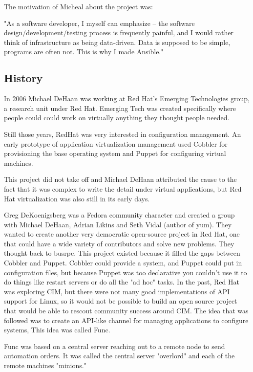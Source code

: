 \documentclass[12pt,a4paper,openright,twoside]{book}
\begin{document}
The motivation of Micheal about the project was:


"As a software developer, I myself can emphasize -- the software design/development/testing process is frequently painful, and I would rather think of infrastructure as being data-driven. Data is supposed to be simple, programs are often not. This is why I made Ansible."

\subsection{History}
In 2006 Michael DeHaan was working at Red Hat's Emerging Technologies group, a research unit under Red Hat. Emerging Tech was created specifically where people could could work on virtually anything they thought people needed.


Still those years, RedHat was very interested in configuration management. An early prototype of application virtualization management used Cobbler for provisioning the base operating system and Puppet for configuring virtual machines.


This project did not take off and Michael DeHaan attributed the cause to the fact that it was complex to write the detail under virtual applications, but Red Hat virtualization was also still in its early days.


Greg DeKoenigsberg was a Fedora community character and created a group with Michael DeHaan, Adrian Likins and Seth Vidal (author of yum). They wanted to create another very democratic open-source project in Red Hat, one that could have a wide variety of contributors and solve new problems. They thought back to busrpc. This project existed because it filled the gaps between Cobbler and Puppet. Cobbler could provide a system, and Puppet could put in configuration files, but because Puppet was too declarative you couldn't use it to do things like restart servers or do all the "ad hoc" tasks. In the past, Red Hat was exploring CIM, but there were not many good implementations of API support for Linux, so it would not be possible to build an open source project that would be able to rescout community success around CIM. The idea that was followed was to create an API-like channel for managing applications to configure systems, This idea was called Func.


Func was based on a central server reaching out to a remote node to send automation orders. It was called the central server "overlord" and each of the remote machines "minions." 
\end{document}
